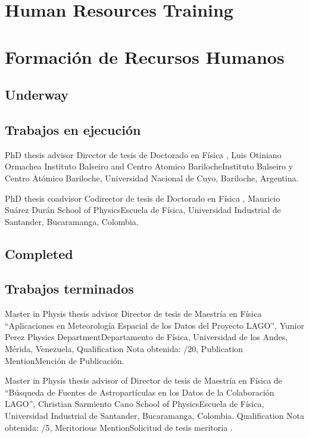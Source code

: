 \ifeng
\section*{Human Resources Training}
\else
\section*{Formación de Recursos Humanos}
\fi


\ifeng
	\subsection*{Underway}
\else
	\subsection*{Trabajos en ejecución}
\fi

\ifeng
PhD thesis advisor
 \else
Director de tesis de Doctorado en Física
 \fi
, Luis Otiniano Ormachea \at \ifeng Instituto Balseiro and Centro Atomico Bariloche\else Instituto Balseiro y Centro Atómico Bariloche\fi, Universidad Nacional de Cuyo, Bariloche, Argentina.

\ifeng
PhD thesis coadvisor
 \else
Codirector de tesis de Doctorado en Física
 \fi
, Mauricio Suárez Durán \at \ifeng School of Physics\else Escuela de Física\fi, Universidad Industrial de Santander, Bucaramanga, Colombia.


\ifeng
\subsection*{Completed}
\else
\subsection*{Trabajos terminados}
\fi

\ifeng
Master in Physis thesis advisor
 \else
Director de tesis de Maestría en Física
 \fi
 ``Aplicaciones en Meteorología Espacial de los Datos del Proyecto LAGO'', Yunior Perez \at \ifeng Physics Department\else Departamento de Física\fi, Universidad de los Andes, Mérida, Venezuela, \ifeng Qualification \else Nota obtenida: /20, \ifeng Publication Mention\else Mención de Publicación\fi.

\ifeng
Master in Physis thesis advisor of
 \else
Director de tesis de Maestría en Física de
 \fi
``Búsqueda de Fuentes de Astropartículas en los Datos de la Colaboración LAGO'', Christian Sarmiento Cano \at \ifeng School of Physics\else Escuela de Física\fi, Universidad Industrial de Santander, Bucaramanga, Colombia. \ifeng Qualification \else Nota obtenida: /5, \ifeng Meritorious Mention\else Solicitud de tesis meritoria \fi.

